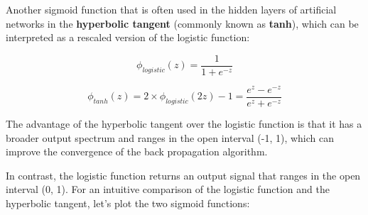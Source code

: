 \documentclass[11pt]{article}
\begin{document}
    Another sigmoid function that is often used in the hidden layers of
artificial networks in the \textbf{hyperbolic tangent} (commonly known
as \textbf{tanh}), which can be interpreted as a rescaled version of the
logistic function:

\[\phi_{logistic}(z) = \frac{1}{1 + e^{-z}}\]

\[\phi_{tanh}(z) = 2 \times \phi_{logistic}(2z)-1 = \frac{e^z - e^{-z}}{e^z + e^{-z}}\]

The advantage of the hyperbolic tangent over the logistic function is
that it has a broader output spectrum and ranges in the open interval
(-1, 1), which can improve the convergence of the back propagation
algorithm.

In contrast, the logistic function returns an output signal that ranges
in the open interval (0, 1). For an intuitive comparison of the logistic
function and the hyperbolic tangent, let's plot the two sigmoid
functions:
\end{document}
